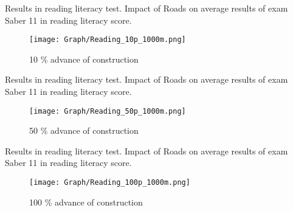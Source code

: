 \documentclass[9pt]{beamer}
\begin{document}
\begin{frame}{ Results in reading literacy test.  \hyperlink{result_read_}{} } \label{10p_read}
Impact of Roads on average results of exam Saber 11 in reading literacy score.
\begin{figure}
  \centering
  \texttt{[image: Graph/Reading\_10p\_1000m.png]} 
  \caption{\small 10 \% advance of construction}
  \label{fig:6.1sub-first}
\end{figure}

\end{frame}
\begin{frame}{ Results in reading literacy test.  \hyperlink{result_read_}{}  }\label{50p_read}
Impact of Roads on average results of exam Saber 11 in reading literacy score.
\begin{figure}
  \centering
  \texttt{[image: Graph/Reading\_50p\_1000m.png]} 
  \caption{\small 50 \% advance of construction}
  \label{fig:6.1sub-first}
\end{figure}

\end{frame}
\begin{frame}{ Results in reading literacy test.   \hyperlink{result_read_}{} }\label{100p_read}
Impact of Roads on average results of exam Saber 11 in reading literacy score.
\begin{figure}
  \centering
  \texttt{[image: Graph/Reading\_100p\_1000m.png]} 
  \caption{\small 100 \% advance of construction}
 
\end{figure}

\end{frame}



\end{document}

